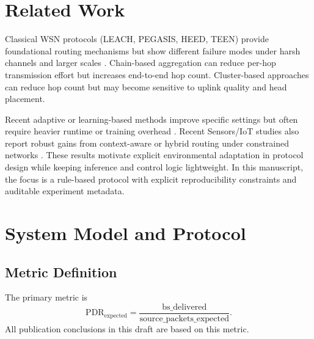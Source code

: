 ﻿\documentclass[sensors,article,submit,moreauthors,pdftex]{Definitions/mdpi}
\begin{document}
\section{Related Work}
Classical WSN protocols (LEACH, PEGASIS, HEED, TEEN) provide foundational routing mechanisms but show different failure modes under harsh channels and larger scales \cite{Heinzelman2002LEACH,Lindsey2002PEGASIS,Younis2004HEED,Kandris2020}. Chain-based aggregation can reduce per-hop transmission effort but increases end-to-end hop count. Cluster-based approaches can reduce hop count but may become sensitive to uplink quality and head placement.

Recent adaptive or learning-based methods improve specific settings but often require heavier runtime or training overhead \cite{Ren2024,Okine2024,Chen2019Survey}. Recent Sensors/IoT studies also report robust gains from context-aware or hybrid routing under constrained networks \cite{ElFouly2023ILP,Dan2024EMRAR,Bhukya2025Hybrid}. These results motivate explicit environmental adaptation in protocol design while keeping inference and control logic lightweight. In this manuscript, the focus is a rule-based protocol with explicit reproducibility constraints and auditable experiment metadata.

\section{System Model and Protocol}
\subsection{Metric Definition}
The primary metric is
\begin{equation}
\mathrm{PDR}_{\mathrm{expected}} = \frac{\mathrm{bs\_delivered}}{\mathrm{source\_packets\_expected}}.
\end{equation}
All publication conclusions in this draft are based on this metric.
\end{document}
